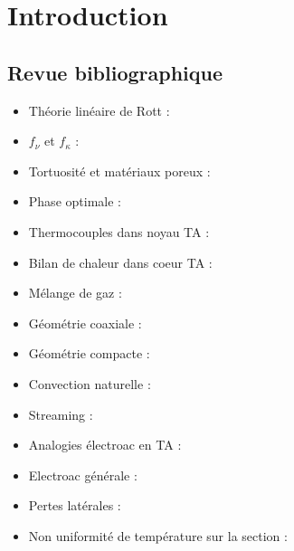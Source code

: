 \chapter{Introduction}\label{chap:Intro}%
\mylocaltoc

\section{Revue bibliographique}

\begin{itemize}
    \item Théorie linéaire de Rott : \cite{rott_damped_1969, rott_thermally_1973, rott_thermally_1975, rott_thermally_1976, zouzoulas_thermally_1976, rott_thermoacoustics_1980, muller_thermally_1983} 
    \item $f_\nu$ et $f_\kappa$ : \cite{swift_thermoacoustics_2017,di_giulio_wire_2023}
    \item Tortuosité et matériaux poreux : \cite{johnson_theory_1987}
    \item Phase optimale : \cite{poignand_etude_2006}
    \item Thermocouples dans noyau TA : \cite{duffourd_refrigerateur_2001, penelet_etude_2004}
    \item Bilan de chaleur dans coeur TA : \cite{penelet_etude_2004}
    \item Mélange de gaz : \cite{belcher_working_1999}
    \item Géométrie coaxiale : \cite{poignand_analysis_2013, poignand_thermoacoustic_2011, tijani_study_2008, ramadan_design_2021}
    \item Géométrie compacte : \cite{poignand_etude_2006}
    \item Convection naturelle : \cite{ross_influence_2003, hireche_numerical_2019, pan_visualization_2012, bianchi_transferts_2004, babaei_investigation_2010, gardner_cascade_2003}
    \item Streaming : \cite{so_internal_2006, bailliet_acoustic_2001, ramadan_experimental_2018}
    \item Analogies électroac en TA : \cite{wakeland_use_2000, backhaus_thermoacoustic-stirling_2000, poignand_analysis_2013}
    \item Electroac générale : \cite{rossi_electroacoustique_1986, novak_measurement_2019}
    \item Pertes latérales : \cite{penelet_etude_2004, guedra_etudes_2012}
    \item Non uniformité de température sur la section : \cite{penelet_etude_2004}
\end{itemize}

